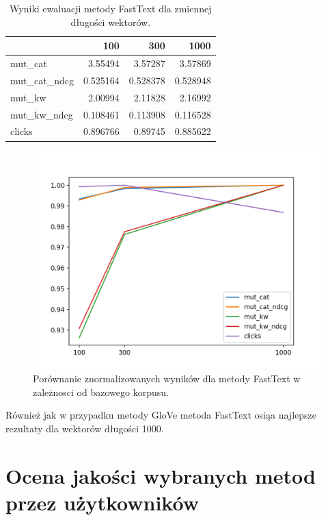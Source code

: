 \documentclass[pl]{minipw} %
\begin{document}
\begin{table}
	\centering
	\begin{tabular}{lrrr}
		\hline
		&      100 &      300 &     1000 \\
		\hline
		mut\_cat      & 3.55494  & 3.57287  & 3.57869  \\
		mut\_cat\_ndcg & 0.525164 & 0.528378 & 0.528948 \\
		mut\_kw       & 2.00994  & 2.11828  & 2.16992  \\
		mut\_kw\_ndcg  & 0.108461 & 0.113908 & 0.116528 \\
		clicks       & 0.896766 & 0.89745  & 0.885622 \\
		\hline
	\end{tabular}
	\caption{Wyniki ewaluacji metody FastText dla zmiennej długości wektorów.}
\end{table}

\begin{figure}[H]
	\centering
	\includegraphics[width=1\textwidth]{img/results/ft_ctr.png}
	\caption{Porównanie znormalizowanych wyników dla metody FastText w zależnosci od bazowego korpusu.}
\end{figure}

Również jak w przypadku metody GloVe metoda FastText osiąa najlepsze rezultaty dla wektorów długości 1000.

\section{Ocena jakości wybranych metod przez użytkowników}
\end{document}
